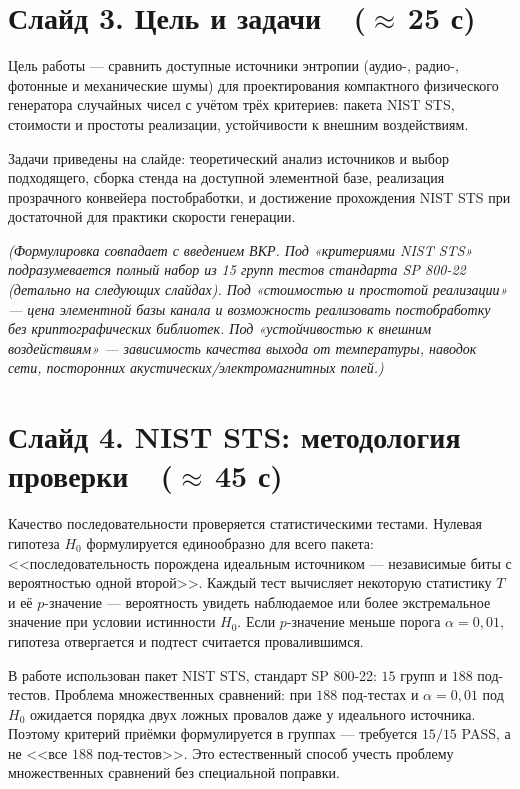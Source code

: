 \documentclass[12pt,a4paper]{extarticle}
\newcommand{\note}[1]{%
  \par
  {\small\color{noteclr}\itshape (#1)}%
  \par}
\begin{document}
\section*{Слайд 3. Цель и задачи~~($\approx$\,25 с)}

Цель работы --- сравнить доступные источники энтропии (аудио-, радио-,
фотонные и механические шумы) для проектирования компактного физического
генератора случайных чисел с учётом трёх критериев: пакета NIST STS,
стоимости и простоты реализации, устойчивости к внешним воздействиям.

Задачи приведены на слайде: теоретический анализ источников и выбор
подходящего, сборка стенда на доступной элементной базе, реализация
прозрачного конвейера постобработки, и достижение прохождения NIST STS
при достаточной для практики скорости генерации.

\note{Формулировка совпадает с введением ВКР. Под «критериями NIST STS»
подразумевается полный набор из 15 групп тестов стандарта SP 800-22 (детально
на следующих слайдах). Под «стоимостью и простотой реализации» --- цена
элементной базы канала и возможность реализовать постобработку без
криптографических библиотек. Под «устойчивостью к внешним воздействиям» ---
зависимость качества выхода от температуры, наводок сети, посторонних
акустических/электромагнитных полей.}

\section*{Слайд 4. NIST STS: методология проверки~~($\approx$\,45 с)}

Качество последовательности проверяется статистическими тестами. Нулевая
гипотеза $H_0$ формулируется единообразно для всего пакета: <<последовательность
порождена идеальным источником --- независимые биты с вероятностью одной второй>>.
Каждый тест вычисляет некоторую статистику $T$ и её $p$-значение ---
вероятность увидеть наблюдаемое или более экстремальное значение при условии
истинности $H_0$. Если $p$-значение меньше порога $\alpha = 0{,}01$, гипотеза
отвергается и подтест считается провалившимся.

В работе использован пакет NIST STS, стандарт SP 800-22: $15$ групп и $188$
под-тестов. Проблема множественных сравнений: при $188$ под-тестах и
$\alpha = 0{,}01$ под $H_0$ ожидается порядка двух ложных провалов даже у
идеального источника. Поэтому критерий приёмки формулируется в группах ---
требуется $15/15$ PASS, а не <<все $188$ под-тестов>>. Это естественный способ
учесть проблему множественных сравнений без специальной поправки.
\end{document}
